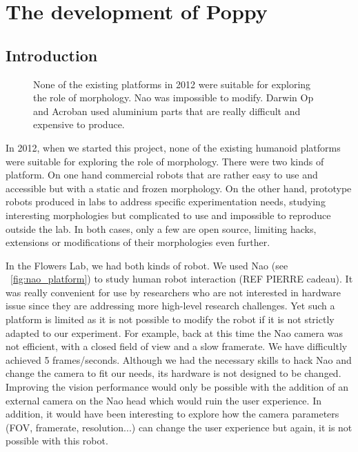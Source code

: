 
% 
\chapter{The development of Poppy} %


\section{Introduction} %

\begin{figure}[tb]
\centering
    \hfil
    \hfil
    \caption{None of the existing platforms in 2012 were suitable for exploring the role of morphology. Nao was impossible to modify. Darwin Op and Acroban used aluminium parts that are really difficult and expensive to produce.}
    \label{fig:2012_Humanoids}
\end{figure}

In 2012, when we started this project, none of the existing humanoid platforms were suitable for exploring the role of morphology. There were two kinds of platform. On one hand commercial robots that are rather easy to use and accessible but with a static and frozen morphology. On the other hand, prototype robots produced in labs to address specific experimentation needs, studying interesting morphologies but complicated to use and impossible to reproduce outside the lab. In both cases, only a few are open source, limiting hacks, extensions or modifications of their morphologies even further.

In the Flowers Lab, we had both kinds of robot. We used Nao (see \figurename~\ref{fig:nao_platform}) to study human robot interaction (REF PIERRE cadeau). It was really convenient for use by researchers who are not interested in hardware issue since they are addressing more high-level research challenges. Yet such a platform is limited as it is not possible to modify the robot if it is not strictly adapted to our experiment. For example, back at this time the Nao camera was not efficient, with a closed field of view and a slow framerate. We have difficultly achieved 5 frames/seconds. Although we had the necessary skills to hack Nao and change the camera to fit our needs, its hardware is not designed to be changed. Improving the vision performance would only be possible with the addition of an external camera on the Nao head which would ruin the user experience. In addition, it would have been interesting to explore how the camera parameters (FOV, framerate, resolution...) can change the user experience but again, it is not possible with this robot.

